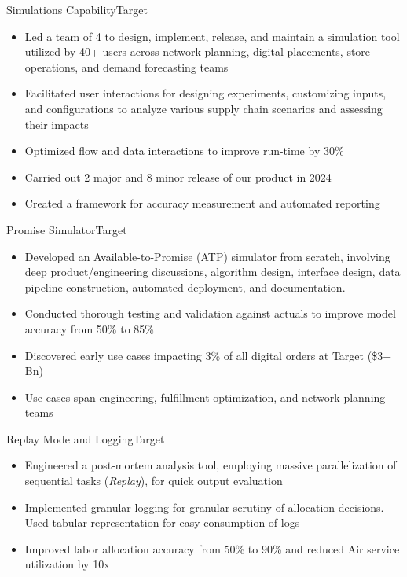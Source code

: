 \documentclass[11pt,a4paper,]{moderncv}
\begin{document}
\nopagebreak
    {Simulations Capability}{Target}{}{}{
    \begin{itemize}
        \item Led a team of 4 to design, implement, release, and maintain a simulation tool utilized by 40+ users across network planning, digital placements, store operations, and demand forecasting teams
        \item Facilitated user interactions for designing experiments, customizing inputs, and configurations to analyze various supply chain scenarios and assessing their impacts
        \item Optimized flow and data interactions to improve run-time by 30\%
        \item Carried out 2 major and 8 minor release of our product in 2024
        \item Created a framework for accuracy measurement and automated reporting
    \end{itemize}
    }
    {Promise Simulator}{Target}{}{}{
    \begin{itemize}
        \item Developed an Available-to-Promise (ATP) simulator from scratch, involving deep product/engineering discussions, algorithm design, interface design, data pipeline construction, automated deployment, and documentation. 
        \item Conducted thorough testing and validation against actuals to improve model accuracy from 50\% to 85\%
        \item Discovered early use cases impacting 3\% of all digital orders at Target (\$3+ Bn)
        \item Use cases span engineering, fulfillment optimization, and network planning teams
    \end{itemize}
    }
    {Replay Mode and Logging}{Target}{}{}{
    \begin{itemize}
        \item Engineered a post-mortem analysis tool, employing massive parallelization of sequential tasks (\emph{Replay}), for quick output evaluation
        \item Implemented granular logging for granular scrutiny of allocation decisions. Used tabular representation for easy consumption of logs
        \item Improved labor allocation accuracy from 50\% to 90\% and reduced Air service utilization by 10x
    \end{itemize}
    }
\end{document}
